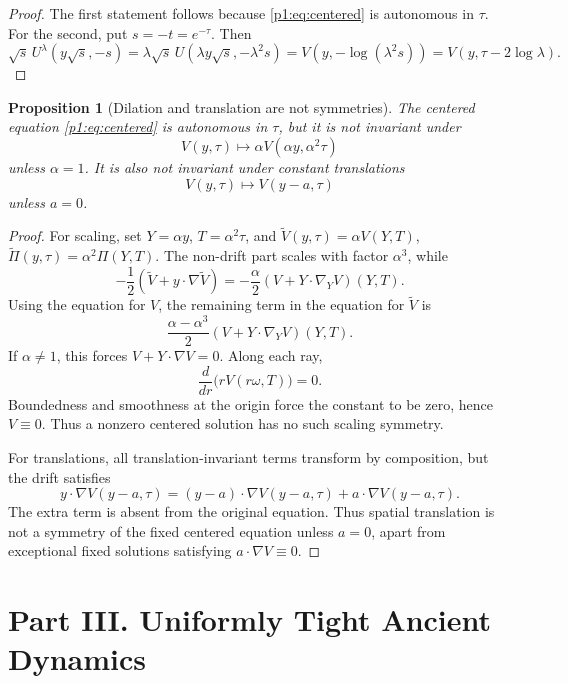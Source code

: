 \documentclass[11pt]{amsart}
\theoremstyle{plain}
\newtheorem{proposition}[proposition]{Proposition}
\theoremstyle{definition}
\theoremstyle{remark}
\numberwithin{equation}{section}
\begin{document}
\begin{proof}
The first statement follows because \eqref{p1:eq:centered} is autonomous in
\(\tau\).  For the second, put \(s=-t=e^{-\tau}\).  Then
\[
   \sqrt{s}\,U^\lambda(y\sqrt{s},-s)
   =
   \lambda\sqrt{s}\,U(\lambda y\sqrt{s},-\lambda^2s)
   =
   V(y,-\log(\lambda^2s))
   =
   V(y,\tau-2\log\lambda).
\]
\end{proof}

\begin{proposition}[Dilation and translation are not symmetries]
\label{p1:prop:no-cascade}
The centered equation \eqref{p1:eq:centered} is autonomous in \(\tau\), but it is
not invariant under
\[
   V(y,\tau)\mapsto \alpha V(\alpha y,\alpha^2\tau)
\]
unless \(\alpha=1\).  It is also not invariant under constant translations
\[
   V(y,\tau)\mapsto V(y-a,\tau)
\]
unless \(a=0\).
\end{proposition}

\begin{proof}
For scaling, set \(Y=\alpha y\), \(T=\alpha^2\tau\), and
\(\widetilde V(y,\tau)=\alpha V(Y,T)\),
\(\widetilde\Pi(y,\tau)=\alpha^2\Pi(Y,T)\).  The non-drift part scales with
factor \(\alpha^3\), while
\[
   -\frac12(\widetilde V+y\cdot\nabla\widetilde V)
   =
   -\frac{\alpha}{2}(V+Y\cdot\nabla_YV)(Y,T).
\]
Using the equation for \(V\), the remaining term in the equation for \(\widetilde V\) is
\[
   \frac{\alpha-\alpha^3}{2}(V+Y\cdot\nabla_YV)(Y,T).
\]
If \(\alpha\ne1\), this forces \(V+Y\cdot\nabla V=0\).  Along each ray,
\[
   \frac{d}{dr}\bigl(rV(r\omega,T)\bigr)=0.
\]
Boundedness and smoothness at the origin force the constant to be zero, hence
\(V\equiv0\).  Thus a nonzero centered solution has no such scaling symmetry.

For translations, all translation-invariant terms transform by composition,
but the drift satisfies
\[
   y\cdot\nabla V(y-a,\tau)
   =
   (y-a)\cdot\nabla V(y-a,\tau)+a\cdot\nabla V(y-a,\tau).
\]
The extra term is absent from the original equation.  Thus spatial
translation is not a symmetry of the fixed centered equation unless \(a=0\),
apart from exceptional fixed solutions satisfying \(a\cdot\nabla V\equiv0\).
\end{proof}



\clearpage
\section*{Part III. Uniformly Tight Ancient Dynamics}
\end{document}

